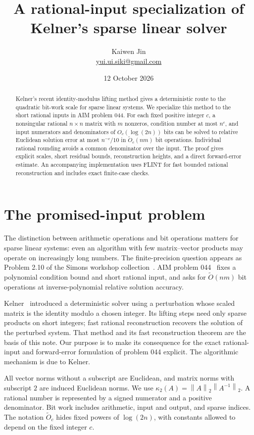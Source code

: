 \documentclass[11pt]{article}
\title{A rational-input specialization of Kelner's sparse linear solver}
\author{Kaiwen Jin\\\small\href{mailto:yui.ui.siki@gmail.com}{yui.ui.siki@gmail.com}}
\date{12 October 2026}
\newcommand{\norm}[1]{\left\lVert#1\right\rVert}
\newcommand{\softO}{\widetilde O}
\begin{document}
\maketitle
\begin{abstract}
Kelner's recent identity-modulus lifting method gives a deterministic route to
the quadratic bit-work scale for sparse linear systems. We specialize this
method to the short rational inputs in AIM problem 044. For each fixed positive
integer $c$, a nonsingular rational $n\times n$ matrix with $m$ nonzeros,
condition number at most $n^c$, and input numerators and denominators of
$O_c(\log(2n))$ bits can be solved to relative Euclidean solution error at most
$n^{-c}/10$ in $\softO_c(nm)$ bit operations. Individual rational rounding
avoids a common denominator over the input. The proof gives explicit scales,
short residual bounds, reconstruction heights, and a direct forward-error
estimate. An accompanying implementation uses FLINT for fast bounded rational
reconstruction and includes exact finite-case checks.
\end{abstract}

\section{The promised-input problem}
The distinction between arithmetic operations and bit operations matters for
sparse linear systems: even an algorithm with few matrix--vector products may
operate on increasingly long numbers. The finite-precision question appears
as Problem 2.10 of the Simons workshop collection~\cite{workshop}. AIM
problem 044~\cite{aim} fixes a polynomial condition bound and short rational
input, and asks for $\softO(nm)$ bit operations at inverse-polynomial relative
solution accuracy.

Kelner~\cite{kelner} introduced a deterministic solver using a perturbation
whose scaled matrix is the identity modulo a chosen integer. Its lifting
steps need only sparse products on short integers; fast rational
reconstruction recovers the solution of the perturbed system. That method
and its fast reconstruction theorem are the basis of this note. Our purpose
is to make its consequence for the exact rational-input and forward-error
formulation of problem 044 explicit. The algorithmic mechanism is due to
Kelner.

All vector norms without a subscript are Euclidean, and matrix norms with
subscript $2$ are induced Euclidean norms. We use
$\kappa_2(A)=\norm{A}_2\norm{A^{-1}}_2$. A rational number is represented by
a signed numerator and a positive denominator. Bit work includes arithmetic,
input and output, and sparse indices. The notation $\softO_c$ hides fixed
powers of $\log(2n)$, with constants allowed to depend on the fixed integer
$c$.
\end{document}
